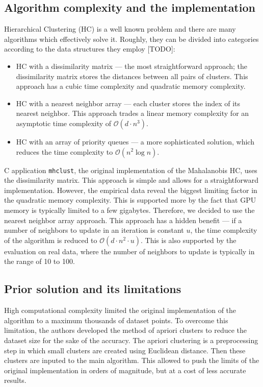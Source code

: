\subsection{Algorithm complexity and the implementation}

Hierarchical Clustering (HC) is a well known problem and there are many algorithms which effectively solve it. Roughly, they can be divided into categories according to the data structures they employ [TODO]:
\begin{itemize}
    \item HC with a dissimilarity matrix --- the most straightforward approach; the dissimilarity matrix stores the distances between all pairs of clusters. This approach has a cubic time complexity and quadratic memory complexity.
    \item HC with a nearest neighbor array --- each cluster stores the index of its nearest neighbor. This approach trades a linear memory complexity for an asymptotic time complexity of $\mathcal{O}(d \cdot n^3)$.
    \item HC with an array of priority queues --- a more sophisticated solution, which reduces the time complexity to $\mathcal{O}(n^2 \log n)$.
\end{itemize}

C application \texttt{mhclust}, the original implementation of the Mahalanobis HC, uses the dissimilarity matrix. This approach is simple and allows for a straightforward implementation. However, the empirical data reveal the biggest limiting factor in the quadratic memory complexity. This is supported more by the fact that GPU memory is typically limited to a few gigabytes. Therefore, we decided to use the nearest neighbor array approach. This approach has a hidden benefit --- if a number of neighbors to update in an iteration is constant $u$, the time complexity of the algorithm is reduced to $\mathcal{O}(d \cdot n^2 \cdot u)$. This is also supported by the evaluation on real data, where the number of neighbors to update is typically in the range of 10 to 100. 


\subsection{Prior solution and its limitations}

High computational complexity limited the original implementation of the algorithm to a maximum thousands of dataset points. To overcome this limitation, the authors developed the method of apriori clusters to reduce the dataset size for the sake of the accuracy. The apriori clustering is a preprocessing step in which small clusters are created using Euclidean distance. Then these clusters are inputed to the main algorithm. This allowed to push the limits of the original implementation in orders of magnitude, but at a cost of less accurate results.

